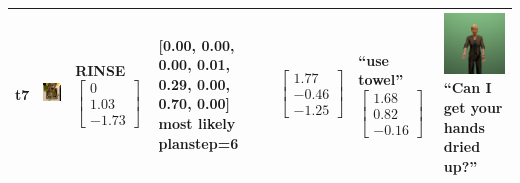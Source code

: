 \begin{longtable}{| V{0.8cm} | V{2.6cm} | V{1.6cm} | V{2.1cm} | V{1.55cm} | V{1.6cm} | V{3.2cm} |}
t7 &
\includegraphics[width=\linewidth]{fig/system/_slow2-rinse3_.jpg} &
RINSE
\linebreak\linebreak
$\begin{bmatrix}
0 \\
1.03 \\
-1.73
\end{bmatrix}$ &
[0.00, 0.00, 0.00, 0.01, 0.29, 0.00, 0.70, 0.00] most likely planstep=6 &
$\begin{bmatrix}
1.77 \\
-0.46 \\
-1.25
\end{bmatrix}$ &
``use towel''
\linebreak\linebreak
$\begin{bmatrix}
1.68 \\
0.82 \\
-0.16
\end{bmatrix}$ &
\includegraphics[width=2.6cm]{fig/prompt/_can-i-get-your-hands-dried-up_.jpg}
\linebreak
\footnotesize
``Can I get your hands dried up?''
\\ \hline



\end{longtable}
